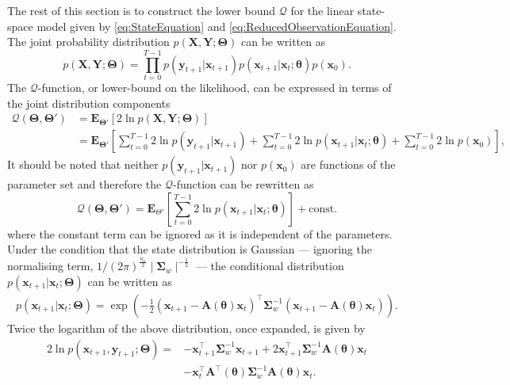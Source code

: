 \documentclass[11pt,draftcls,onecolumn,peerreview]{IEEEtran}
\begin{document}
 The rest of this section is to construct the lower bound $\mathcal Q$ for the linear state-space model given by \eqref{eq:StateEquation} and \eqref{eq:ReducedObservationEquation}. The joint probability distribution $p(\mathbf X,\mathbf Y;\boldsymbol \Theta)$ can be written as
 \begin{equation}\label{eq:jointdistribution}
  p(\mathbf X,\mathbf Y;\boldsymbol \Theta)=\prod_{t=0}^{T-1} p(\mathbf y_{t+1}|\mathbf x_{t+1})p(\mathbf x_{t+1}|\mathbf x_{t};\boldsymbol \theta)p(\mathbf x_0).
 \end{equation}
 The $\mathcal Q$-function, or lower-bound on the likelihood, can be expressed in terms of the joint distribution components
 \begin{align}
  \mathcal Q(\boldsymbol \Theta,\boldsymbol\Theta')&=\mathbf E_{\boldsymbol \Theta'}\left[2\ln p(\mathbf X,\mathbf Y;\boldsymbol \Theta)\right] \nonumber \\
 &=\mathbf E_{\boldsymbol\Theta'}\left[\sum_{t=0}^{T-1}2\ln p(\mathbf y_{t+1}|\mathbf x_{t+1})+\sum_{t=0}^{T-1}2\ln p(\mathbf x_{t+1}|\mathbf x_{t};\boldsymbol \theta)
 +\sum_{t=0}^{T-1}2\ln p(\mathbf x_0)\right],
 \end{align}   
It should be noted that neither $p(\mathbf y_{t+1}|\mathbf x_{t+1})$ nor $p(\mathbf x_0)$ are functions of the parameter set and therefore the $\mathcal Q$-function can be rewritten as
\begin{equation}
\mathcal Q(\boldsymbol \Theta,\boldsymbol\Theta')=\mathbf E_{\Theta'}\left[\sum_{t=0}^{T-1}2\ln p(\mathbf x_{t+1}|\mathbf x_{t};\boldsymbol \theta)\right]+\mathrm{const.}
\end{equation}
where the constant term can be ignored as it is independent of the parameters. Under the condition that the state distribution is Gaussian --- ignoring the normalising term, $1/(2\pi)^{\frac{n_x}{2}}\mid\boldsymbol\Sigma_w\mid^{-\frac{1}{2}}$ --- the conditional distribution $p(\mathbf x_{t+1} | \mathbf x_{t};\boldsymbol\Theta)$ can be written as
\begin{align}
p(\mathbf x_{t+1} | \mathbf x_{t};\boldsymbol\Theta)=  \exp\left({-\frac{1}{2}\left(\mathbf x_{t+1}-\mathbf A\left(\boldsymbol\theta\right)\mathbf  x_t\right)^\top\boldsymbol\Sigma_w^{-1}\left(\mathbf x_{t+1}-\mathbf A\left(\boldsymbol\theta\right)\mathbf  x_t\right)}\right).
\end{align}
Twice the logarithm of the above distribution, once expanded, is given by
\begin{align}\label{eq:Qfunction}
2\ln p(\mathbf x_{t+1} , \mathbf y_{t+1};\boldsymbol\Theta)=&-\mathbf x_{t+1}^\top\boldsymbol\Sigma_w^{-1}\mathbf x_{t+1}+2\mathbf x_{t+1}^\top\boldsymbol\Sigma_w^{-1}\mathbf A( \boldsymbol\theta)\mathbf x_t\nonumber \\
&-\mathbf x_t^\top\mathbf A^\top(\boldsymbol\theta)\boldsymbol\Sigma_w^{-1}\mathbf A(\boldsymbol\theta)\mathbf x_t.
\end{align}
\end{document}
